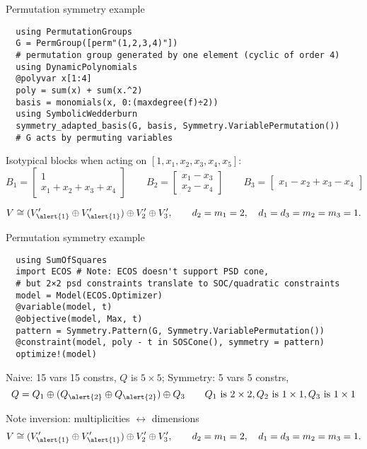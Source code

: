 \begin{frame}[fragile]{Permutation symmetry example}
\footnotesize
\begin{verbatim}
  using PermutationGroups
  G = PermGroup([perm"(1,2,3,4)"])
  # permutation group generated by one element (cyclic of order 4)
  using DynamicPolynomials
  @polyvar x[1:4]
  poly = sum(x) + sum(x.^2)
  basis = monomials(x, 0:(maxdegree(f)÷2))
  using SymbolicWedderburn
  symmetry_adapted_basis(G, basis, Symmetry.VariablePermutation())
  # G acts by permuting variables
\end{verbatim}

Isotypical blocks when acting on $[1, x_1, x_2, x_3, x_4, x_5]$:
\[
  B_1 = \begin{bmatrix}
          1\\
          x_1 + x_2 + x_3 + x_4
        \end{bmatrix}
  \qquad
  B_2 = \begin{bmatrix}
          x_1 - x_3\\
          x_2 - x_4
        \end{bmatrix}
  \qquad
  B_3 = \begin{bmatrix}
          x_1 - x_2 + x_3 - x_4
        \end{bmatrix}
\]

  \[V \cong (V_{\alert{1}}' \oplus V_{\alert{1}}') \oplus V_2' \oplus V_3', \qquad d_2 = m_1 = 2, \quad d_1 = d_3 = m_2 = m_3 = 1.\]
\end{frame}

\begin{frame}[fragile]{Permutation symmetry example}
\footnotesize
\begin{verbatim}
  using SumOfSquares
  import ECOS # Note: ECOS doesn't support PSD cone,
  # but 2×2 psd constraints translate to SOC/quadratic constraints
  model = Model(ECOS.Optimizer)
  @variable(model, t)
  @objective(model, Max, t)
  pattern = Symmetry.Pattern(G, Symmetry.VariablePermutation())
  @constraint(model, poly - t in SOSCone(), symmetry = pattern)
  optimize!(model)
\end{verbatim}

\normalsize

  Naive: 15 vars 15 constrs, $Q$ is $5\times 5$; Symmetry: 5 vars 5 constrs,
  \[ Q = Q_1 \oplus (Q_{\alert{2}} \oplus Q_{\alert{2}}) \oplus Q_3 \qquad Q_1 \text{ is }2\times 2, Q_2 \text{ is }1\times 1, Q_3 \text{ is }1\times 1 \]

  Note inversion: multiplicities $\leftrightarrow$ dimensions
  \[V \cong (V_{\alert{1}}' \oplus V_{\alert{1}}') \oplus V_2' \oplus V_3', \qquad d_2 = m_1 = 2, \quad d_1 = d_3 = m_2 = m_3 = 1.\]

\end{frame}

